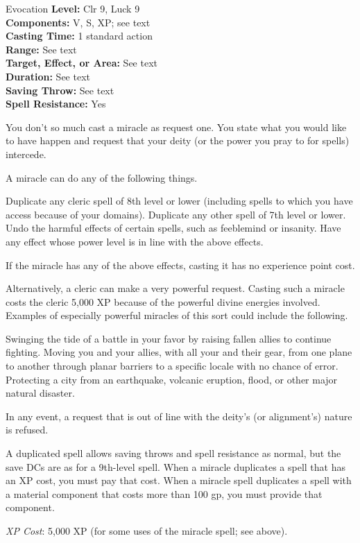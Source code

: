 {Evocation}
{
	\textbf{Level:}
	Clr 9, Luck 9\\
	\textbf{Components:}
	V, S, XP; see text\\
	\textbf{Casting Time:}
	1 standard action\\
	\textbf{Range:}
	See text\\
	\textbf{Target, Effect, or Area:}
	See text\\
	\textbf{Duration:}
	See text\\
	\textbf{Saving Throw:}
	See text\\
	\textbf{Spell Resistance:}
	Yes\\
}
{
	You don't so much cast a miracle as request one. You state what you would like to have happen and request that your deity (or the power you pray to for spells) intercede.

	A miracle can do any of the following things.


Duplicate any cleric spell of 8th level or lower (including spells to which you have access because of your domains).
Duplicate any other spell of 7th level or lower.
Undo the harmful effects of certain spells, such as feeblemind or insanity.
Have any effect whose power level is in line with the above effects.

	If the miracle has any of the above effects, casting it has no experience point cost.

	Alternatively, a cleric can make a very powerful request. Casting such a miracle costs the cleric 5,000 XP because of the powerful divine energies involved. Examples of especially powerful miracles of this sort could include the following.


Swinging the tide of a battle in your favor by raising fallen allies to continue fighting.
Moving you and your allies, with all your and their gear, from one plane to another through planar barriers to a specific locale with no chance of error.
Protecting a city from an earthquake, volcanic eruption, flood, or other major natural disaster.

	In any event, a request that is out of line with the deity's (or alignment's) nature is refused.

	A duplicated spell allows saving throws and spell resistance as normal, but the save DCs are as for a 9th-level spell. When a miracle duplicates a spell that has an XP cost, you must pay that cost. When a miracle spell duplicates a spell with a material component that costs more than 100 gp, you must provide that component.

	\textit{XP Cost}:
	5,000 XP (for some uses of the miracle spell; see above).

}
